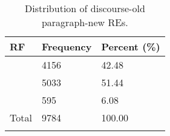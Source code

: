 \begin{table}
\centering
\begin{tabularx}{\textwidth}{lYY}
  \lsptoprule
RF & Frequency & Percent (\%) \\ 
  \midrule
{} & 4156 & 42.48 \\ 
   & 5033 & 51.44 \\ 
   & 595 & 6.08 \vspace{0.1cm} \\ 
  \midrule
  Total & 9784 & 100.00 \\ 
   \lspbottomrule
\end{tabularx}
\caption{Distribution of discourse-old paragraph-new REs.} 
\label{tab:firstMentionParag}
\end{table}
